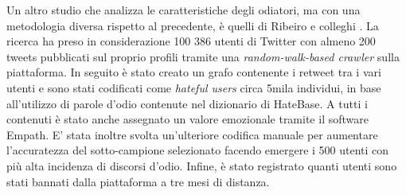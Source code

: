 Un altro studio che analizza le caratteristiche degli odiatori, ma con una metodologia diversa rispetto al precedente, è quelli di Ribeiro e colleghi \citep{ribeiro2018}.
La ricerca ha preso in considerazione 100 386 utenti di Twitter con almeno 200 tweets pubblicati sul proprio profili tramite una \textit{random-walk-based crawler} sulla piattaforma. 
In seguito è stato creato un grafo contenente i retweet tra i vari utenti e sono stati  codificati come \textit{hateful users} circa 5mila individui, in base all'utilizzo di parole d'odio contenute nel dizionario di HateBase. A tutti i contenuti è stato anche assegnato un valore emozionale tramite il software Empath. E’ stata inoltre svolta un'ulteriore codifica manuale per aumentare l'accuratezza del sotto-campione selezionato facendo emergere i 500 utenti con più alta incidenza di discorsi d'odio. Infine, è stato registrato quanti utenti sono stati bannati dalla piattaforma a tre mesi di distanza.

